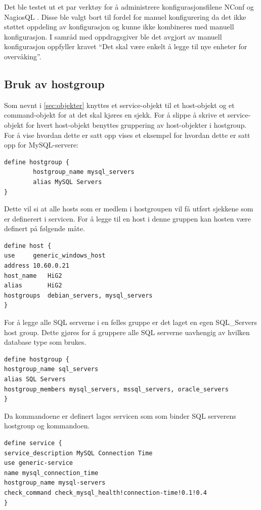 Det ble testet ut et par verktøy for å administrere konfigurasjonsfilene NConf \cite{nconf} og NagiosQL \cite{nagiosql}. Disse ble valgt bort til fordel for manuel konfigurering da det ikke støttet oppdeling av konfigurasjon og kunne ikke kombineres med manuell konfigurasjon. I samråd med oppdragsgiver ble det avgjort av manuell konfigurasjon oppfyller kravet “Det skal være enkelt å legge til nye enheter for overvåking”.

\subsection{Bruk av hostgroup}
Som nevnt i \ref{sec:objekter} knyttes et service-objekt til et host-objekt og et command-objekt for at det skal kjøres en sjekk. For å slippe å skrive et service-objekt for hvert host-objekt benyttes gruppering av host-objekter i hostgroup. For å vise hvordan dette er satt opp vises et eksempel for hvordan dette er satt opp for MySQL-servere:

\begin{lstlisting}
define hostgroup {
        hostgroup_name mysql_servers
        alias MySQL Servers
}
\end{lstlisting}
Dette vil si at alle hosts som er medlem i hostgroupen vil få utført sjekkene som er definerert i servicen. For å legge til en host i denne gruppen kan hosten være definert på følgende måte.

\begin{lstlisting}
define host {
use		generic_windows_host
address	10.60.0.21
host_name	HiG2
alias		HiG2
hostgroups	debian_servers, mysql_servers
}
\end{lstlisting}
For å legge alle SQL serverne i en felles gruppe er det laget en egen SQL\_Servers host group. Dette gjøres for å gruppere alle SQL serverne uavhengig av hvilken database type som brukes. 

\begin{lstlisting}
define hostgroup {
hostgroup_name sql_servers
alias SQL Servers
hostgroup_members mysql_servers, mssql_servers, oracle_servers
}
\end{lstlisting}
Da kommandoene er definert lages servicen som som binder SQL serverens hostgroup og kommandoen.

\begin{lstlisting}
define service {
service_description MySQL Connection Time
use generic-service
name mysql_connection_time
hostgroup_name mysql-servers
check_command check_mysql_health!connection-time!0.1!0.4
}
\end{lstlisting}

